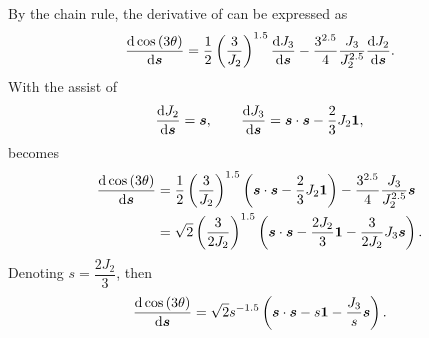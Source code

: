 By the chain rule, the derivative of  can be expressed as
\begin{gather}\label{eq:dlode}
\dfrac{\mathrm{d}\cos\left(3\theta\right)}{\mathrm{d}\bm{s}}=\dfrac{1}{2}\left(\dfrac{3}{J_2}\right)^{1.5}\dfrac{\mathrm{d}J_3}{\mathrm{d}\bm{s}}-\dfrac{3^{2.5}}{4}\dfrac{J_3}{J_2^{2.5}}\dfrac{\mathrm{d}J_2}{\mathrm{d}\bm{s}}.
\end{gather}
With the assist of
\begin{gather}
\dfrac{\mathrm{d}J_2}{\mathrm{d}\bm{s}}=\bm{s},\qquad
\dfrac{\mathrm{d}J_3}{\mathrm{d}\bm{s}}=\bm{s}\cdot\bm{s}-\dfrac{2}{3}J_2\bm{1},
\end{gather}
 becomes
\begin{gather}
\begin{split}
\dfrac{\mathrm{d}\cos\left(3\theta\right)}{\mathrm{d}\bm{s}}&=\dfrac{1}{2}\left(\dfrac{3}{J_2}\right)^{1.5}\left(\bm{s}\cdot\bm{s}-\dfrac{2}{3}J_2\bm{1}\right)-\dfrac{3^{2.5}}{4}\dfrac{J_3}{J_2^{2.5}}\bm{s}\\
&=\sqrt{2}\left(\dfrac{3}{2J_2}\right)^{1.5}\left(\bm{s}\cdot\bm{s}-\dfrac{2J_2}{3}\bm{1}-\dfrac{3}{2J_2}J_3\bm{s}\right).
\end{split}
\end{gather}
Denoting $s=\dfrac{2J_2}{3}$, then
\begin{gather}
\dfrac{\mathrm{d}\cos\left(3\theta\right)}{\mathrm{d}\bm{s}}=\sqrt{2}s^{-1.5}\left(\bm{s}\cdot\bm{s}-s\bm{1}-\dfrac{J_3}{s}\bm{s}\right).
\end{gather}